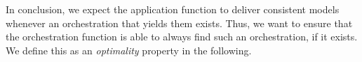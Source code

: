 In conclusion, we expect the application function to deliver consistent models whenever an orchestration that yields them exists.
Thus, we want to ensure that the orchestration function is able to always find such an orchestration, if it exists.
We define this as an \emph{optimality} property in the following.








